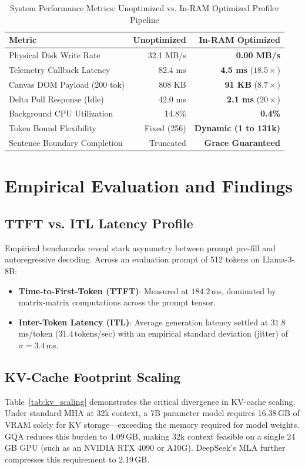 \documentclass[10pt,twocolumn]{article}
\begin{document}
\begin{table}[t]
\centering
\caption{System Performance Metrics: Unoptimized vs. In-RAM Optimized Profiler Pipeline}
\label{tab:optimizations}
\small
\begin{tabular}{lrr}
\toprule
\textbf{Metric} & \textbf{Unoptimized} & \textbf{In-RAM Optimized} \\
\midrule
Physical Disk Write Rate & 32.1 MB/s & \textbf{0.00 MB/s} \\
Telemetry Callback Latency & 82.4 ms & \textbf{4.5 ms} ($18.5\times$) \\
Canvas DOM Payload (200 tok) & 808 KB & \textbf{91 KB} ($8.7\times$) \\
Delta Poll Response (Idle) & 42.0 ms & \textbf{2.1 ms} ($20\times$) \\
Background CPU Utilization & 14.8\% & \textbf{0.4\%} \\
Token Bound Flexibility & Fixed (256) & \textbf{Dynamic (1 to 131k)} \\
Sentence Boundary Completion & Truncated & \textbf{Grace Guaranteed} \\
\bottomrule
\end{tabular}
\end{table}

\section{Empirical Evaluation and Findings}

\subsection{TTFT vs. ITL Latency Profile}
Empirical benchmarks reveal stark asymmetry between prompt pre-fill and autoregressive decoding. Across an evaluation prompt of 512 tokens on Llama-3-8B:
\begin{itemize}
    \item \textbf{Time-to-First-Token (TTFT)}: Measured at $184.2$\,ms, dominated by matrix-matrix computations across the prompt tensor.
    \item \textbf{Inter-Token Latency (ITL)}: Average generation latency settled at $31.8$\,ms/token ($31.4$\,tokens/sec) with an empirical standard deviation (jitter) of $\sigma = 3.4$\,ms.
\end{itemize}

\subsection{KV-Cache Footprint Scaling}
Table~\ref{tab:kv_scaling} demonstrates the critical divergence in KV-cache scaling. Under standard MHA at 32k context, a 7B parameter model requires 16.38\,GB of VRAM solely for KV storage---exceeding the memory required for model weights. GQA reduces this burden to 4.09\,GB, making 32k context feasible on a single 24\,GB GPU (such as an NVIDIA RTX 4090 or A10G). DeepSeek's MLA further compresses this requirement to 2.19\,GB.
\end{document}
